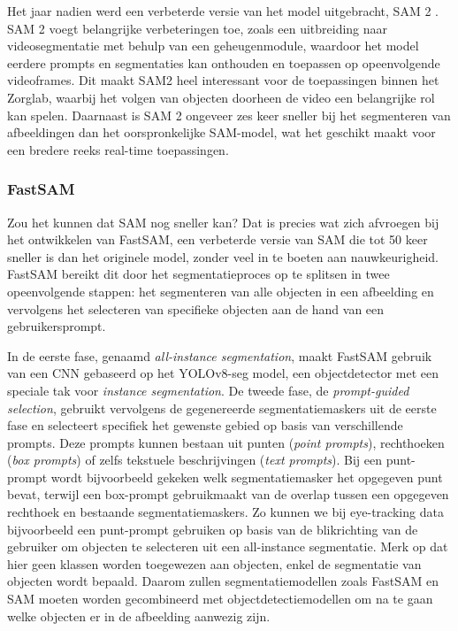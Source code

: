 Het jaar nadien werd een verbeterde versie van het model uitgebracht, SAM 2 \autocite{Ravi2024}. 
SAM 2 voegt belangrijke verbeteringen toe, zoals een uitbreiding naar videosegmentatie met behulp van een geheugenmodule, waardoor het model eerdere prompts en segmentaties kan onthouden en toepassen op opeenvolgende videoframes. 
Dit maakt SAM2 heel interessant voor de toepassingen binnen het Zorglab, waarbij het volgen van objecten doorheen de video een belangrijke rol kan spelen.
Daarnaast is SAM 2 ongeveer zes keer sneller bij het segmenteren van afbeeldingen dan het oorspronkelijke SAM-model, wat het geschikt maakt voor een bredere reeks real-time toepassingen.

\subsubsection{FastSAM}

Zou het kunnen dat SAM nog sneller kan? 
Dat is precies wat \textcite{Zhao2023} zich afvroegen bij het ontwikkelen van FastSAM, een verbeterde versie van SAM die tot 50 keer sneller is dan het originele model, zonder veel in te boeten aan nauwkeurigheid.
FastSAM bereikt dit door het segmentatieproces op te splitsen in twee opeenvolgende stappen: het segmenteren van alle objecten in een afbeelding en vervolgens het selecteren van specifieke objecten aan de hand van een gebruikersprompt.

In de eerste fase, genaamd \textit{all-instance segmentation}, maakt FastSAM gebruik van een CNN gebaseerd op het YOLOv8-seg model, een objectdetector met een speciale tak voor \textit{instance segmentation}. 
De tweede fase, de \textit{prompt-guided selection}, gebruikt vervolgens de gegenereerde segmentatiemaskers uit de eerste fase en selecteert specifiek het gewenste gebied op basis van verschillende prompts. 
Deze prompts kunnen bestaan uit punten (\textit{point prompts}), rechthoeken (\textit{box prompts}) of zelfs tekstuele beschrijvingen (\textit{text prompts}). 
Bij een punt-prompt wordt bijvoorbeeld gekeken welk segmentatiemasker het opgegeven punt bevat, terwijl een box-prompt gebruikmaakt van de overlap tussen een opgegeven rechthoek en bestaande segmentatiemaskers.
Zo kunnen we bij eye-tracking data bijvoorbeeld een punt-prompt gebruiken op basis van de blikrichting van de gebruiker om objecten te selecteren uit een all-instance segmentatie.
Merk op dat hier geen klassen worden toegewezen aan objecten, enkel de segmentatie van objecten wordt bepaald. 
Daarom zullen segmentatiemodellen zoals FastSAM en SAM moeten worden gecombineerd met objectdetectiemodellen om na te gaan welke objecten er in de afbeelding aanwezig zijn.

